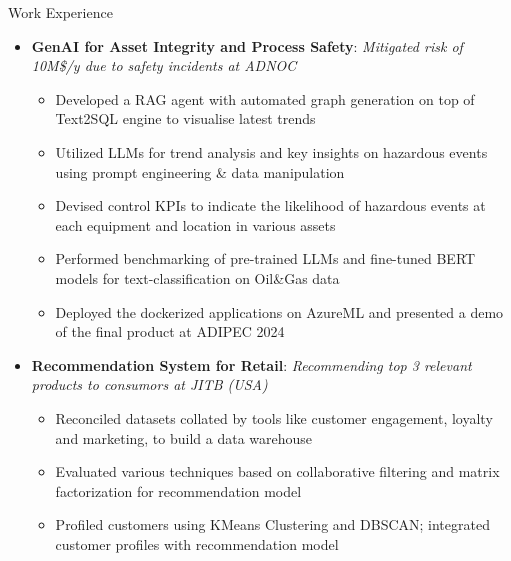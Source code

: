 \documentclass{resume} %
\begin{document}
\begin{rSection}{Work Experience}
\begin{itemize}[leftmargin=1em,rightmargin=0.2in ,itemsep=-5pt, topsep=-5pt, before={\vspace{0.0ex}},after=\vspace{-1ex}]

 \item \begingroup \spaceskip=2.2pt \textbf{GenAI for Asset Integrity and Process Safety}: \emph{Mitigated risk of 10M\$/y due to safety incidents at ADNOC}
			\endgroup
		\begin{itemize}[leftmargin=0em,itemsep=-6pt, topsep=-5pt, before={\vspace{-0.3ex}},after=\vspace{0.5ex}]
		\item  \begingroup
			\spaceskip=2.5pt
				Developed a RAG agent with automated graph generation on top of Text2SQL engine to visualise latest trends
			\endgroup
		\item \begingroup
			\spaceskip=2.2pt
				Utilized LLMs for trend analysis and key insights on hazardous events using prompt engineering \& data manipulation
				\endgroup
			\item \begingroup
			\spaceskip=2.2pt
				Devised control KPIs to indicate the likelihood of hazardous events at each equipment and location in various assets
				\endgroup
		\item 
\begingroup
			\spaceskip=2.5pt
				Performed benchmarking of pre-trained LLMs and fine-tuned BERT models for text-classification on Oil\&Gas data			\endgroup
		\item Deployed the dockerized applications on AzureML and presented a demo of the final product at ADIPEC 2024
		\end{itemize}

 \item \textbf{Recommendation System for Retail}:
\begingroup
			\spaceskip=2.2pt
\emph{Recommending top 3 relevant products to consumors at JITB (USA)}
			\endgroup
		\begin{itemize}[leftmargin=0em,itemsep=-6pt, topsep=-5pt, before={\vspace{-0.3ex}},after=\vspace{0.5ex}]
		\item  \begingroup \spaceskip=2.2pt
				Reconciled datasets collated by tools like customer engagement, loyalty and marketing, to build a data warehouse
			\endgroup
		\item \begingroup \spaceskip=2.5pt
				Evaluated various techniques based on collaborative filtering and matrix factorization for recommendation model
				\endgroup
		\item \begingroup \spaceskip=2.2pt Profiled customers using KMeans Clustering and DBSCAN; integrated customer profiles with recommendation model\endgroup
		\end{itemize}


\end{itemize}
\end{rSection}
\end{document}

